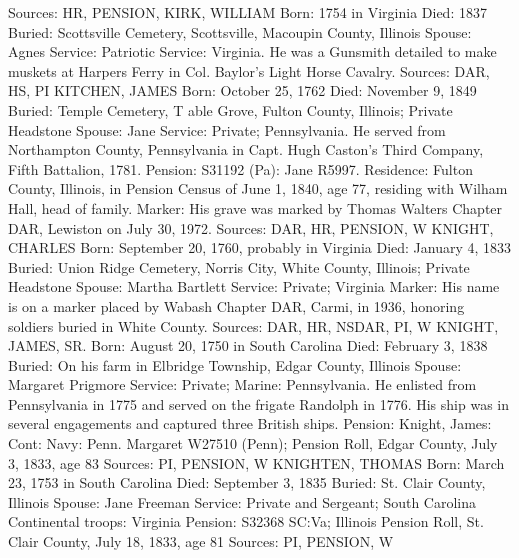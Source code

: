 Sources: HR, PENSION, \V 
KIRK, WILLIAM 
Born: 1754 in Virginia
Died: 1837
Buried: Scottsville Cemetery, Scottsville, Macoupin County, Illinois
Spouse: Agnes
Service: Patriotic Service: Virginia. He was a Gunsmith detailed to make muskets at Harpers Ferry in Col. Baylor's Light Horse Cavalry.
Sources: DAR, HS, PI 
KITCHEN, JAMES
Born: October 25, 1762
Died: November 9, 1849
Buried: Temple Cemetery, T able Grove, Fulton County, Illinois; Private Headstone
Spouse: Jane 
Service: Private; Pennsylvania. He served from Northampton County, Pennsylvania in Capt. Hugh Caston's Third Company, Fifth Battalion, 1781. 
Pension: S31192 (Pa): Jane R5997. 
Residence: Fulton County, Illinois, in Pension Census of June 1, 1840, age 77, residing with Wilham Hall, head of family.
Marker: His grave was marked by Thomas Walters Chapter DAR, Lewiston on July 30, 1972.
Sources: DAR, HR, PENSION, W 
KNIGHT, CHARLES
Born: September 20, 1760, probably in Virginia
Died: January 4, 1833 
Buried: Union Ridge Cemetery, Norris City, White County, Illinois; Private Headstone
Spouse: Martha Bartlett
Service: Private; Virginia
Marker: His name is on a marker placed by Wabash Chapter DAR, Carmi, in 1936, honoring soldiers buried in White County.
Sources: DAR, HR, NSDAR, PI, W 
KNIGHT, JAMES, SR.
Born: August 20, 1750 in South Carolina
Died: February 3, 1838
Buried: On his farm in Elbridge Township, Edgar County, Illinois
Spouse: Margaret Prigmore
Service: Private; Marine: Pennsylvania. He enlisted from Pennsylvania in 1775 and served on the frigate Randolph in 1776. His ship was in several engage­ments and captured three British ships. Pension: Knight, James: Cont: Navy: Penn. Margaret W27510 (Penn); Pension Roll, Edgar County, July 3, 1833, age 83
Sources: PI, PENSION, W 
KNIGHTEN, THOMAS
Born: March 23, 1753 in South Carolina
Died: September 3, 1835
Buried: St. Clair County, Illinois
Spouse: Jane Freeman
Service: Private and Sergeant; South Carolina Continental troops: Virginia Pension: S32368 SC:Va; Illinois Pension Roll, St. Clair County, July 18, 1833, age 81
Sources: PI, PENSION, W 

